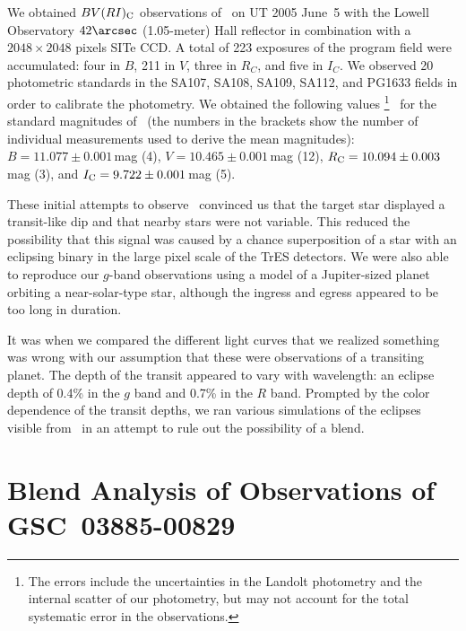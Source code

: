 We obtained $BV(RI)_{\rm C}$ observations of \gscOTE\ on UT 2005 June~5
with the Lowell Observatory $42\arcsec$ (1.05-meter) Hall reflector in
combination with a $2048 \times 2048 $ pixels SITe CCD. A total of 223
exposures of the program field were accumulated: four in $B$, 211 in
$V$, three in $R_C$, and five in $I_C$. We observed 20 photometric
standards in the SA107, SA108, SA109, SA112, and PG1633 fields
\citep{Landolt:aj:1992a} in order to calibrate the photometry. We
obtained the following values%
\footnote{The errors include the uncertainties in the Landolt
  photometry and the internal scatter of our photometry, but may not
  account for the total systematic error in the observations.}%
\ for the standard magnitudes of \gscOTE\ (the numbers in the brackets
show the number of individual measurements used to derive the mean
magnitudes): $B = 11.077 \pm 0.001$\,mag (4), $V = 10.465 \pm 0.001$\,mag (12), $R_{\rm C} = 10.094 \pm 0.003$\,mag (3), and $I_{\rm C} = 9.722 \pm 0.001$\,mag (5).

These initial attempts to observe \gscOTE\ convinced us that the target
star displayed a transit-like dip and that nearby stars were not
variable. This reduced the possibility that this signal was caused by
a chance superposition of a star with an eclipsing binary in the large
pixel scale of the TrES detectors. We were also able to reproduce our
$g$-band observations using a model of a Jupiter-sized planet
orbiting a near-solar-type star, although the ingress and egress
appeared to be too long in duration.

It was when we compared the different light curves that we realized
something was wrong with our assumption that these were observations
of a transiting planet. The depth of the transit appeared to vary with
wavelength: an eclipse depth of 0.4\% in the $g$ band and 0.7\% in the
$R$ band. Prompted by the color dependence of the transit depths, we
ran various simulations of the eclipses visible from \gscOTE\ in an
attempt to rule out the possibility of a blend.

\section{Blend Analysis of Observations of \\ \mbox{GSC 03885-00829}}\label{cha:gsc:sec:blend}

